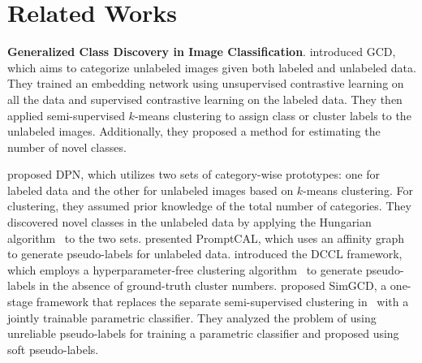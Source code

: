 




\section{Related Works}
\noindent \textbf{Generalized Class Discovery in Image Classification}. 
\cite{vaze2022generalized} introduced GCD, which aims to categorize unlabeled images given both labeled and unlabeled data. They trained an embedding network using unsupervised contrastive learning on all the data and supervised contrastive learning on the labeled data. They then applied semi-supervised $k$-means clustering to assign class or cluster labels to the unlabeled images. Additionally, they proposed a method for estimating the number of novel classes.


\cite{An2023Generalized} proposed DPN, which utilizes two sets of category-wise prototypes: one for labeled data and the other for unlabeled images based on $k$-means clustering. For clustering, they assumed prior knowledge of the total number of categories. They discovered novel classes in the unlabeled data by applying the Hungarian algorithm~\cite{kuhn1955hungarian} to the two sets. \cite{Zhang2023PromptCAL} presented PromptCAL, which uses an affinity graph to generate pseudo-labels for unlabeled data. \cite{Pu2023Dynamic} introduced the DCCL framework, which employs a hyperparameter-free clustering algorithm~\cite{Martin2008Maps} to generate pseudo-labels in the absence of ground-truth cluster numbers. \cite{wen2023parametric} proposed SimGCD, a one-stage framework that replaces the separate semi-supervised clustering in~\cite{vaze2022generalized} with a jointly trainable parametric classifier. They analyzed the problem of using unreliable pseudo-labels for training a parametric classifier and proposed using soft pseudo-labels.

